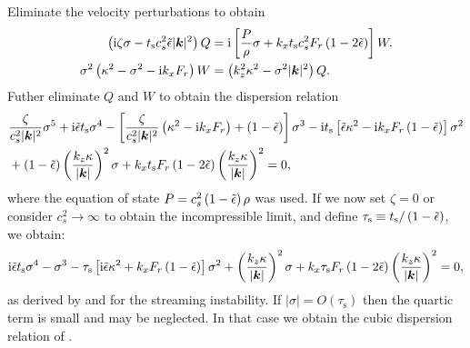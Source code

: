 Eliminate the velocity perturbations to obtain
\begin{align}
  \left(\mathrm{i} \zeta \sigma - t_\mathrm{s} c_s^2 \tilde{\epsilon} |\bm{k}|^2\right)Q &=
  \mathrm{i} \left[
  \frac{P}{\rho}\sigma + k_xt_\mathrm{s} c_s^2 F_r\left(1 -
  2\tilde{\epsilon}\right)\right]W. \\
   \sigma^2 \left( \kappa^2 - \sigma^2 - \mathrm{i} k_x F_r\right)W &=
    \left(k_z^2\kappa^2 - \sigma^2|\bm{k}|^2\right)Q. 
\end{align}
Futher eliminate $Q$ and $W$ to obtain the dispersion relation
\begin{align}
  &\frac{\zeta}{c_s^2|\bm{k}|^2}\sigma^5 + \mathrm{i} \tilde{\epsilon} t_\mathrm{s}
  \sigma^4 - \left[ \frac{\zeta}{c_s^2|\bm{k}|^2} \left(\kappa^2 - \mathrm{i}
  k_x F_r\right) + \left(1 - \tilde{\epsilon}\right)\right]\sigma^3 - \mathrm{i}
  t_\mathrm{s} \left[\tilde{\epsilon} \kappa^2 - \mathrm{i} k_x F_r\left( 1 -
  \tilde{\epsilon}\right)\right]\sigma^2 \notag\\ 
  &+ \left(1 -
  \tilde{\epsilon}\right)\left(\frac{k_z\kappa}{|\bm{k}|}\right)^2\sigma +
  k_x t_\mathrm{s} F_r\left(1 - 2\tilde{\epsilon}\right)
  \left(\frac{k_z\kappa}{|\bm{k}|}\right)^2  = 0,
\end{align}
where the equation of state $P = c_s^2\left( 1 - \tilde{\epsilon}\right)\rho$
was used. 
If we now set $\zeta = 0$ or consider $c_s^2\to \infty$ to obtain the
incompressible limit, and define $\tau_\mathrm{s} \equiv
t_\mathrm{s}/\left(1 - \tilde{\epsilon}\right)$, we obtain: 
\begin{align*}
\mathrm{i} \tilde{\epsilon} t_\mathrm{s}
  \sigma^4 - \sigma^3 - 
  \tau_\mathrm{s} \left[ \mathrm{i} \tilde{\epsilon} \kappa^2 + k_x F_r\left( 1 -
  \tilde{\epsilon}\right)\right]\sigma^2 
  + \left(\frac{k_z\kappa}{|\bm{k}|}\right)^2\sigma + 
  k_x \tau_\mathrm{s} F_r\left(1 - 2\tilde{\epsilon}\right)
  \left(\frac{k_z\kappa}{|\bm{k}|}\right)^2  = 0,
\end{align*}
as derived by \cite{jacquet11} and \cite{laibe14} for the streaming
instability. If $|\sigma| = O(\tau_\mathrm{s})$ then the quartic term
is small and may be neglected. In that case we obtain the cubic
dispersion relation of \citet{youdin05a}.
